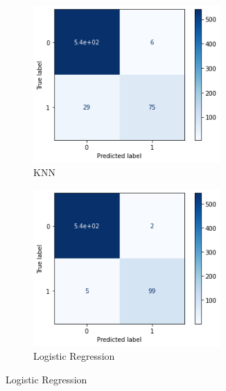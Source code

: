 \begin{figure}[H]
    \begin{subfigure}{0.5\textwidth}
        \includegraphics[width=0.9\linewidth, height=6cm]{img/cm/knn.png}
        \caption{KNN}
        \label{fig:knn}
    \end{subfigure}
    \begin{subfigure}{0.5\textwidth}
        \includegraphics[width=0.9\linewidth, height=6cm]{img/cm/log.png}
        \caption{Logistic Regression}
        \label{fig:log}
    \end{subfigure}
\end{figure}
